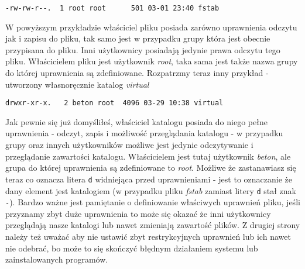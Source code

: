 \begin{verbatim}
-rw-rw-r--.  1 root root      501 03-01 23:40 fstab
\end{verbatim}
W powyższym przykładzie właściciel pliku posiada zarówno uprawnienia odczytu jak i zapisu do pliku, tak samo jest w przypadku grupy która jest obecnie przypisana do pliku. Inni użytkownicy posiadają jedynie prawa odczytu tego pliku. Właścicielem pliku jest użytkownik \textit{root}, taka sama jest także nazwa grupy do której uprawnienia są zdefiniowane. Rozpatrzmy teraz inny przykład - utworzony własnoręcznie katalog \textit{virtual}
\begin{verbatim}
drwxr-xr-x.   2 beton root  4096 03-29 10:38 virtual
\end{verbatim}
Jak pewnie się już domyśliłeś, właściciel katalogu posiada do niego pełne uprawnienia - odczyt, zapis i możliwość przeglądania katalogu - w przypadku grupy oraz innych użytkowników możliwe jest jedynie odczytywanie i przeglądanie zawartości katalogu. Właścicielem jest tutaj użytkownik \textit{beton}, ale grupa do której uprawnienia są zdefiniowane to \textit{root}. Możliwe że zastanawiasz się teraz co oznacza litera \texttt{d} widniejąca przed uprawnieniami - jest to oznaczanie że dany element jest katalogiem (w przypadku pliku \textit{fstab} zamiast litery \texttt{d} stał znak \texttt{-}).
\newline
\newline
Bardzo ważne jest pamiętanie o definiowanie właściwych uprawnień pliku, jeśli przyznamy zbyt duże uprawnienia to może się okazać że inni użytkownicy przeglądają nasze katalogi lub nawet zmieniają zawartość plików. Z drugiej strony należy też uważać aby nie ustawić zbyt restrykcyjnych uprawnień lub ich nawet nie odebrać, bo może to się skończyć błędnym działaniem systemu lub zainstalowanych programów.

